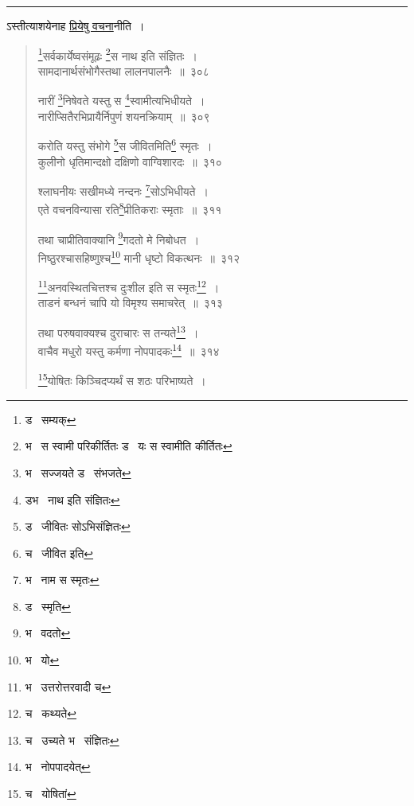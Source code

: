 \documentclass[11pt, openany]{book}
\begin{document}
\hrule

\vspace{2mm}
ऽस्तीत्याशयेनाह \underline{प्रियेषु वचना}नीति~। 

\newpage

\begin{quote}
{\na \renewcommand{\thefootnote}{1}\footnote{ड \textendash\  सम्यक्}सर्वकार्येष्वसंमूढः \renewcommand{\thefootnote}{2}\footnote{भ \textendash\  स स्वामी परिकीर्तितः ड \textendash\  यः स स्वामीति कीर्तितः}स नाथ इति संज्ञितः~। \\
सामदानार्थसंभोगैस्तथा लालनपालनैः~॥~३०८ 

नारीं \renewcommand{\thefootnote}{3}\footnote{भ \textendash\  सज्जयते ड \textendash\  संभजते}निषेवते यस्तु स \renewcommand{\thefootnote}{4}\footnote{डभ \textendash\  नाथ इति संज्ञितः}स्वामीत्यभिधीयते~। \\
नारीप्सितैरभिप्रायैर्निपुणं शयनक्रियाम्~॥~३०९ 

करोति यस्तु संभोगे \renewcommand{\thefootnote}{5}\footnote{ड \textendash\  जीवितः सोऽभिसंज्ञितः}स जीवितमिति\renewcommand{\thefootnote}{6}\footnote{च \textendash\  जीवित इति} स्मृतः~।\\
कुलीनो धृतिमान्दक्षो दक्षिणो वाग्विशारदः~॥~३१० 

श्लाघनीयः सखीमध्ये नन्दनः \renewcommand{\thefootnote}{7}\footnote{भ \textendash\  नाम स स्मृतः}सोऽभिधीयते~।\\
एते वचनविन्यासा रति\renewcommand{\thefootnote}{8}\footnote{ड \textendash\  स्मृति}प्रीतिकराः स्मृताः~॥~३११ 

तथा चाप्रीतिवाक्यानि \renewcommand{\thefootnote}{9}\footnote{भ \textendash\  वदतो}गदतो मे निबोधत~।\\
निष्ठुरश्चासहिष्णुश्च\renewcommand{\thefootnote}{10}\footnote{भ \textendash\  यो} मानी धृष्टो विकत्थनः~॥~३१२ 

\renewcommand{\thefootnote}{11}\footnote{भ \textendash\  उत्तरोत्तरवादी च}अनवस्थितचित्तश्च दुःशील इति स स्मृतः\renewcommand{\thefootnote}{12}\footnote{च \textendash\  कथ्यते}~।\\
ताडनं बन्धनं चापि यो विमृश्य समाचरेत्~॥~३१३ 

तथा परुषवाक्यश्च दुराचारः स तन्यते\renewcommand{\thefootnote}{13}\footnote{च \textendash\  उच्यते भ \textendash\  संज्ञितः}~।\\
वाचैव मधुरो यस्तु कर्मणा नोपपादकः\renewcommand{\thefootnote}{14}\footnote{भ \textendash\  नोपपादयेत्}~॥~३१४

\renewcommand{\thefootnote}{15}\footnote{च \textendash\  योषितां}योषितः किञ्चिदप्यर्थं स शठः परिभाष्यते~।}
\end{quote}
\end{document}
